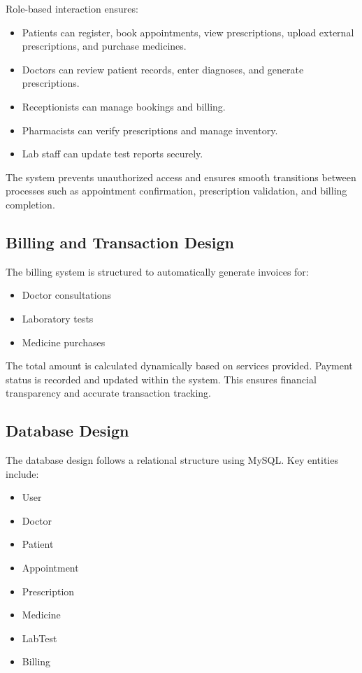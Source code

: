 Role-based interaction ensures:
\begin{itemize}
    \item Patients can register, book appointments, view prescriptions, upload external prescriptions, and purchase medicines.
    \item Doctors can review patient records, enter diagnoses, and generate prescriptions.
    \item Receptionists can manage bookings and billing.
    \item Pharmacists can verify prescriptions and manage inventory.
    \item Lab staff can update test reports securely.
\end{itemize}

The system prevents unauthorized access and ensures smooth transitions between processes such as appointment confirmation, prescription validation, and billing completion.

\subsection{Billing and Transaction Design}

The billing system is structured to automatically generate invoices for:
\begin{itemize}
    \item Doctor consultations
    \item Laboratory tests
    \item Medicine purchases
\end{itemize}

The total amount is calculated dynamically based on services provided. Payment status is recorded and updated within the system. This ensures financial transparency and accurate transaction tracking.

\subsection{Database Design}

The database design follows a relational structure using MySQL. Key entities include:

\begin{itemize}
    \item User
    \item Doctor
    \item Patient
    \item Appointment
    \item Prescription
    \item Medicine
    \item LabTest
    \item Billing
\end{itemize}

